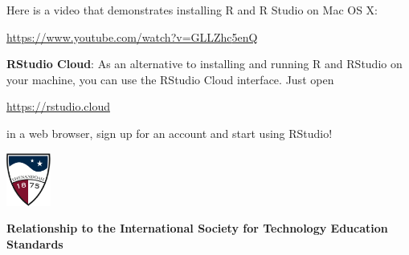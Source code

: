 \documentclass[10pt]{article}
\newcommand{\U}{\underline{\hspace{5pt}}}
\begin{document}
Here is a video that demonstrates installing R and R Studio on Mac OS X:\vspace{-10pt}
\begin{center}
\href{https://www.youtube.com/watch?v=GLLZhc_5enQ}{https://www.youtube.com/watch?v=GLLZhc\U 5enQ}
\end{center}
\bigskip

\textbf{RStudio Cloud}:  As an alternative to installing and running R and RStudio on your
machine, you can use the RStudio Cloud interface.  Just open \vspace{-8pt}
\begin{center}
\href{https://rstudio.cloud}{https://rstudio.cloud}\vspace{-8pt}
\end{center}
in a web browser, sign up for an account and start using RStudio!

\vfill
\eject


\vfill
\eject
\href{http://www.su.edu}{\includegraphics[height=1.75cm]{sulogo.eps}}
\vspace{-.4in}

{\small \hfill
}
\setlength{\baselineskip}{1.05\baselineskip}



\begin{center}
\textbf{\large Relationship to the International Society for Technology Education  Standards}
\end{center}
\end{document}
